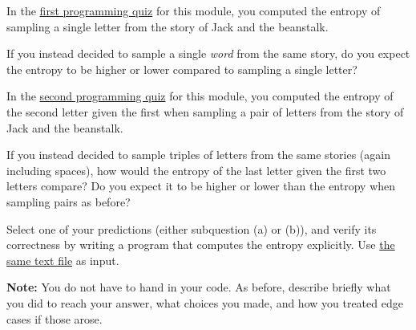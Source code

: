 \documentclass[a4paper,10pt,landscape,twocolumn]{scrartcl}
\begin{document}
\begin{exercise}[Programming (5pt)]
	\begin{subex}[(1pt)]
	In the \href{https://canvas.uva.nl/courses/2205/assignments/5648}{first programming quiz} for this module, you computed the entropy of sampling a single letter from the story of Jack and the beanstalk.
	
	If you instead decided to sample a single \emph{word} from the same story, do you expect the entropy to be higher or lower compared to sampling a single letter?
	\end{subex}
	\begin{subex}[(1pt)]
	In the \href{https://canvas.uva.nl/courses/2205/assignments/5668}{second programming quiz} for this module, you computed the entropy of the second letter given the first when sampling a pair of letters from the story of Jack and the beanstalk.
	
	If you instead decided to sample triples of letters from the same stories (again including spaces), how would the entropy of the last letter given the first two letters compare? Do you expect it to be higher or lower than the entropy when sampling pairs as before?
	\end{subex}
	\begin{subex}[(3pt)]
	Select one of your predictions (either subquestion (a) or (b)), and verify its correctness by writing a program that computes the entropy explicitly. Use \href{https://canvas.uva.nl/files/61660/download?download_frd=1}{the same text file} as input.
	
	\textbf{Note:} You do not have to hand in your code. As before, describe briefly what you did to reach your answer, what choices you made, and how you treated edge cases if those arose.
	\end{subex}
\end{exercise}
\end{document}
